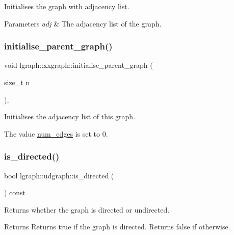 Initialises the graph with adjacency list. 


\begin{DoxyParams}{Parameters}
{\em adj} & The adjacency list of the graph. \\
\hline
\end{DoxyParams}
\mbox{\label{classlgraph_1_1xxgraph_a50c658dd39e6b1d38bf7e514daa2f33c}} 
\subsubsection{\texorpdfstring{initialise\+\_\+parent\+\_\+graph()}{initialise\_parent\_graph()}}
{\footnotesize\ttfamily void lgraph\+::xxgraph\+::initialise\+\_\+parent\+\_\+graph (\begin{DoxyParamCaption}\item[{size\+\_\+t}]{n }\end{DoxyParamCaption})\hspace{0.3cm}{\ttfamily [protected]}, {\ttfamily [inherited]}}



Initialises the adjacency list of this graph. 

The value \hyperlink{classlgraph_1_1xxgraph_a6765a9a3be42f6e0f824635c593b35d7}{num\+\_\+edges} is set to 0. \mbox{\label{classlgraph_1_1udgraph_ab346eaf76d049a5148ffd87cda7eab6a}} 
\subsubsection{\texorpdfstring{is\+\_\+directed()}{is\_directed()}}
{\footnotesize\ttfamily bool lgraph\+::udgraph\+::is\+\_\+directed (\begin{DoxyParamCaption}{ }\end{DoxyParamCaption}) const\hspace{0.3cm}{\ttfamily [virtual]}}



Returns whether the graph is directed or undirected. 

\begin{DoxyReturn}{Returns}
Returns true if the graph is directed. Returns false if otherwise. 
\end{DoxyReturn}


